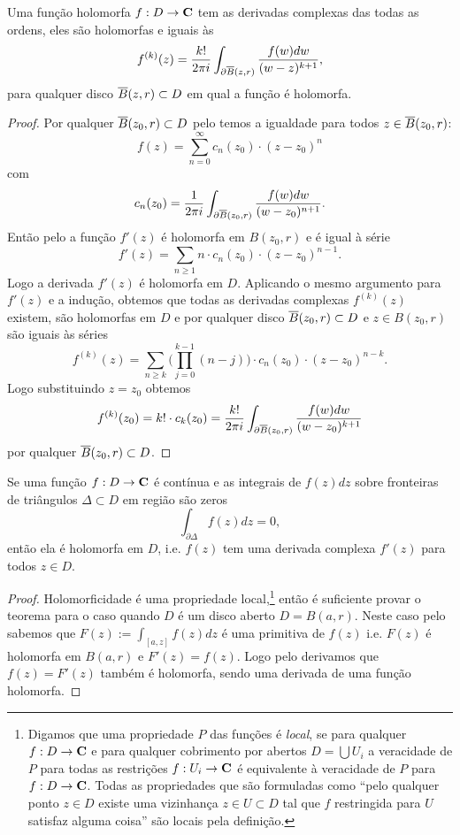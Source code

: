 \begin{teorema}
\label{t:hol-bihol}
Uma função holomorfa $f : D \to \mathbf{C}$ 
tem as derivadas complexas das todas as ordens, eles são holomorfas e iguais às
\begin{equation}
\label{eq:formula-cauchy}
f^{(k)}(z) = \frac{k!}{2\pi i} \int_{\partial \overline{B}(z,r)} \frac{f(w) dw}{(w-z)^{k+1}},
\end{equation}
para qualquer disco $\overline{B}(z,r) \subset D$ em qual a função é holomorfa.
\end{teorema}
\begin{proof}
Por qualquer $\overline{B}(z_0,r) \subset D$ pelo  temos a igualdade para 
todos $z\in \overline{B}(z_0,r)$:
\[ f(z) = \sum_{n=0}^\infty c_n(z_0) \cdot (z-z_0)^n \]
com
\[ c_n(z_0) = \frac{1}{2\pi i} \int_{\partial \overline{B}(z_0,r)} \frac{f(w) dw}{(w-z_0)^{n+1}}. \]
Então pelo  a função $f'(z)$ é holomorfa em $B(z_0,r)$
e é igual à série
\[ f'(z) = \sum_{n\geq 1} n \cdot c_n(z_0) \cdot (z-z_0)^{n-1}. \]
Logo a derivada $f'(z)$ é holomorfa em $D$.
Aplicando o mesmo argumento para $f'(z)$ e a indução, obtemos que todas as derivadas complexas $f^{(k)}(z)$
existem, são holomorfas em $D$ e por qualquer disco $\overline{B}(z_0,r) \subset D$ e $z\in B(z_0,r)$
são iguais às séries
\[ f^{(k)}(z) = \sum_{n\geq k} \big(\prod_{j=0}^{k-1} (n-j)\big) \cdot c_n(z_0) \cdot (z-z_0)^{n-k} .\]
Logo substituindo $z=z_0$ obtemos
\[ f^{(k)}(z_0) = k! \cdot c_k(z_0) = \frac{k!}{2\pi i} \int_{\partial \overline{B}(z_0,r)} \frac{f(w) dw}{(w-z_0)^{k+1}} \]
por qualquer $\overline{B}(z_0,r) \subset D$.
\end{proof}

\begin{teorema}[Morera]
\label{t:morera}
Se uma função $f: D \to \mathbf{C}$ é contínua e as integrais de $f(z) dz$ sobre
fronteiras de triângulos $\Delta \subset D$ em região são zeros
\[ \int_{\partial \Delta} f(z) dz = 0, \]
então ela é holomorfa em $D$, i.e. $f(z)$ tem uma derivada complexa $f'(z)$ para todos $z\in D$.
\end{teorema}
\begin{proof}
Holomorficidade é uma propriedade local,\footnote{Digamos que uma propriedade $P$ das funções é \emph{local},
se para qualquer $f : D \to \mathbf{C}$ e para qualquer cobrimento por abertos $D = \bigcup U_i$
a veracidade de $P$ para todas as restrições $f : U_i \to \mathbf{C}$
é equivalente à veracidade de $P$ para $f : D \to \mathbf{C}$.
Todas as propriedades que são formuladas como ``pelo qualquer ponto $z\in D$
existe uma vizinhança $z \in U \subset D$ tal que $f$ restringida para $U$
satisfaz alguma coisa'' são locais pela definição.}
então é suficiente provar o teorema para o caso
quando $D$ é um disco aberto $D = B(a,r)$. Neste caso pelo 
sabemos que $F(z) := \int_{[a,z]} f(z) dz$ é uma primitiva de $f(z)$ i.e.
$F(z)$ é holomorfa em $B(a,r)$ e $F'(z) = f(z)$.
Logo pelo  derivamos que $f(z) = F'(z)$ também é holomorfa,
sendo uma derivada de uma função holomorfa.
\end{proof}

